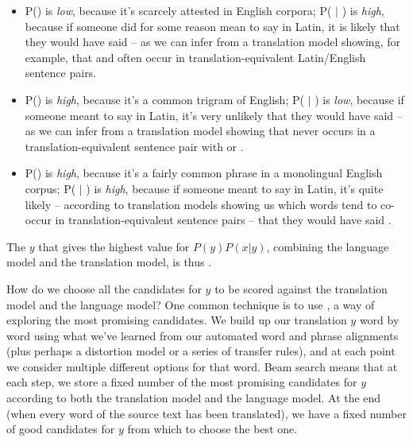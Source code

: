 \begin{itemize}

\item P() is \emph{low}, because it's scarcely attested in English corpora; P( $|$ ) is \emph{high}, because if someone did for some reason mean to say  in Latin, it is likely that they would have said  -- as we can infer from a translation model showing, for example, that  and  often occur in translation-equivalent Latin/English sentence pairs.

\item P() is \emph{high}, because it's a common trigram of English; P( $|$ ) is \emph{low}, because if someone meant to say  in Latin, it's very unlikely that they would have said  -- as we can infer from a translation model showing that  never occurs in a translation-equivalent sentence pair with  or .

\item P() is \emph{high}, because it's a fairly common phrase in a monolingual English corpus; P( $|$ ) is \emph{high}, because if someone meant to say  in Latin, it's quite likely -- according to translation models showing us which words tend to co-occur in translation-equivalent sentence pairs -- that they would have said . 

\end{itemize}

The $y$ that gives the highest value for  $P(y) P(x | y)$, combining the language model and the translation model, is thus .

How do we choose all the candidates for $y$ to be scored against the translation model and the language model?  One common technique is to use , a way of exploring the most promising candidates.   We build up our translation $y$ word by word using what we've learned from our automated word and phrase alignments (plus perhaps a distortion model or a series of transfer rules), and at each point we consider multiple different options for that word.  Beam search means that at each step, we store a fixed number of the most promising candidates for $y$ according to both the translation model and the language model.  At the end (when every word of the source text has been translated), we have a fixed number of good candidates for $y$ from which to choose the best one.  

